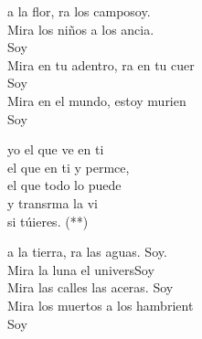 \begin{cancion}[Soy yo][Almudena]%
	a la flor, ra los camposoy.\\
	Mira los niños a los ancia. \\
	Soy \\
	Mira en tu adentro, ra en tu cuer\\
	Soy \\
	Mira en el mundo,  estoy murien \\
	Soy \\
	\begin{chorus}%
	 yo el que ve en ti\\
	el que  en ti y permce,\\
	el que todo lo puede \\
	y transrma la vi\\
	si túieres. (**)\\
	\end{chorus}%
	a la tierra, ra las aguas. Soy.\\
	Mira la luna el universSoy \\
	Mira las calles las aceras. Soy \\
	Mira los muertos a los hambrient\\
	Soy \\
\end{cancion}%
